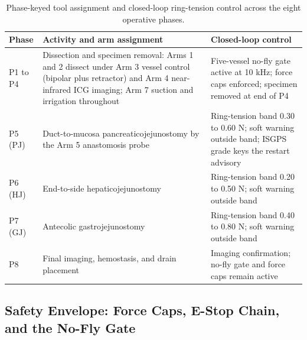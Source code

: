 \begin{table}[t]
\caption{Phase-keyed tool assignment and closed-loop ring-tension control across the eight operative phases.}
\label{tab:sec04-phases}
\centering
\begin{tabularx}{\textwidth}{L{2.0cm} L{7.6cm} Y}
\toprule
\textbf{Phase} & \textbf{Activity and arm assignment} & \textbf{Closed-loop control} \\
\midrule
P1 to P4 & Dissection and specimen removal: Arms 1 and 2 dissect under Arm 3 vessel control (bipolar plus retractor) and Arm 4 near-infrared ICG imaging; Arm 7 suction and irrigation throughout & Five-vessel no-fly gate active at 10 kHz; force caps enforced; specimen removed at end of P4 \\
P5 (PJ) & Duct-to-mucosa pancreaticojejunostomy by the Arm 5 anastomosis probe & Ring-tension band 0.30 to 0.60 N; soft warning outside band; ISGPS grade keys the restart advisory \\
P6 (HJ) & End-to-side hepaticojejunostomy & Ring-tension band 0.20 to 0.50 N; soft warning outside band \\
P7 (GJ) & Antecolic gastrojejunostomy & Ring-tension band 0.40 to 0.80 N; soft warning outside band \\
P8 & Final imaging, hemostasis, and drain placement & Imaging confirmation; no-fly gate and force caps remain active \\
\bottomrule
\end{tabularx}
\vspace*{-0.2cm}
\end{table}

\subsection*{Safety Envelope: Force Caps, E-Stop Chain, and the No-Fly Gate}

